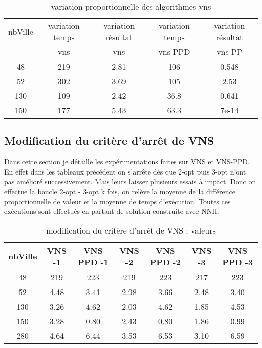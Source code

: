 \documentclass[12pt,a4paper]{article}
\begin{document}
\begin{table}[!h]
\centering
\begin{tabular}{|*{5}{c|}}
  \hline
  nbVille & variation temps & variation résultat & variation temps & variation résultat \\
  ~ & vns & vns & vns PPD & vns PP \\
  \hline
  48 & 219 & 2.81 & 106 & 0.548 \\ 
  52 & 302 & 3.69 & 105 & 2.53 \\
  130 & 109 & 2.42 & 36.8 & 0.641 \\
  150 & 177 & 5.43 & 63.3 & 7e-14 \\
  \hline
\end{tabular}
\caption{variation proportionnelle des algorithmes vns}
\label{variationvnsRGSC}
\end{table}

\subsection{Modification du critère d’arrêt de VNS}

Dans cette section je détaille les expérimentations faites sur VNS et VNS-PPD. En effet dans les tableaux précédent on s'arrête dès que 2-opt puis 3-opt n'ont pas amélioré successivement. Mais leurs laisser plusieurs essais à impact. Donc on effectue la boucle 2-opt - 3-opt k fois, on relève la moyenne de la différence proportionnelle de valeur et la moyenne de temps d’exécution. Toutes ces exécutions sont effectués en partant de solution construite avec NNH.

\begin{table}[!h]
\centering
\begin{tabular}{|*{7}{c|}}
  \hline
  nbVille & VNS -1 & VNS PPD -1 & VNS -2 & VNS PPD -2 & VNS -3 & VNS PPD -3 \\
  \hline
  48 & 219 & 223 & 219 & 223 & 217 & 223 \\ 
  52 & 4.48 & 3.41 & 2.98 & 3.66 & 2.48 & 3.40 \\
  130 & 3.26 & 4.62 & 2.03 & 4.62 & 1.85 & 4.53 \\
  150 & 3.28 & 0.80 & 2.43 & 0.80 & 1.86 & 0.99 \\ 
  280 & 4.64 & 6.44 & 3.53 & 6.53 & 3.10 & 6.59 \\
  \hline
\end{tabular}
\caption{modification du critère d’arrêt de VNS : valeurs}
\label{stopingRuleVNSval}
\end{table}
\end{document}
